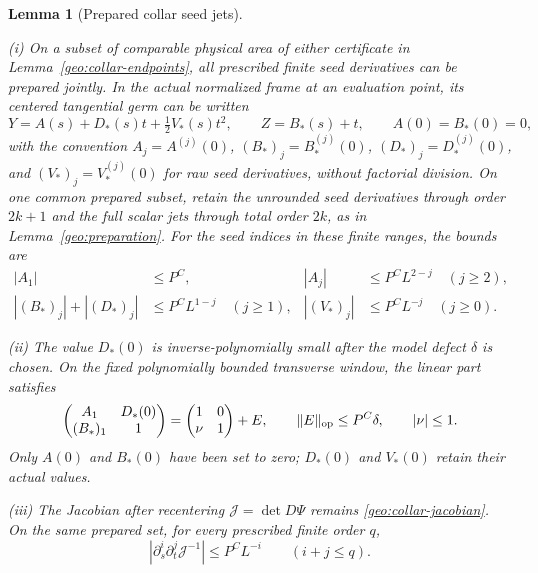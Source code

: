 \documentclass[11pt]{amsart}
\newtheorem{lemma}[theorem]{Lemma}
\theoremstyle{definition}
\theoremstyle{remark}
\numberwithin{equation}{section}
\begin{document}
\begin{lemma}[Prepared collar seed jets]\label{geo:collar-jets}

\leavevmode\noindent\textup{(i)} On a subset of comparable physical area of either certificate in Lemma~\ref{geo:collar-endpoints}, all prescribed finite seed derivatives can be prepared jointly. In the actual normalized frame at an evaluation point, its centered tangential germ can be written
\[
Y=A(s)+D_*(s)t+\tfrac12V_*(s)t^2,\qquad Z=B_*(s)+t,\qquad A(0)=B_*(0)=0,
\]
with the convention $A_j=A^{(j)}(0)$, $(B_*)_j=B_*^{(j)}(0)$, $(D_*)_j=D_*^{(j)}(0)$, and $(V_*)_j=V_*^{(j)}(0)$ for raw seed derivatives, without factorial division. On one common prepared subset, retain the unrounded seed derivatives through order $2k+1$ and the full scalar jets through total order $2k$, as in Lemma~\ref{geo:preparation}. For the seed indices in these finite ranges, the bounds are
\begin{equation}\label{geo:collar-seed-widths}
\begin{aligned}
|A_1|&\le P^C,& |A_j|&\le P^CL^{2-j}\quad(j\ge2),\\
|(B_*)_j|+|(D_*)_j|&\le P^CL^{1-j}\quad(j\ge1),& |(V_*)_j|&\le P^CL^{-j}\quad(j\ge0).
\end{aligned}
\end{equation}

\noindent\textup{(ii)} The value $D_*(0)$ is inverse-polynomially small after the model defect $\delta$ is chosen. On the fixed polynomially bounded transverse window, the linear part satisfies
\[
\begin{pmatrix}A_1&D_*(0)\\(B_*)_1&1\end{pmatrix}=\begin{pmatrix}1&0\\\nu&1\end{pmatrix}+E,\qquad \|E\|_{\rm op}\le P^C\delta,\qquad |\nu|\le1.
\]
Only $A(0)$ and $B_*(0)$ have been set to zero; $D_*(0)$ and $V_*(0)$ retain their actual values.

\noindent\textup{(iii)} The Jacobian after recentering $\mathcal J=\det D\Psi$ remains \eqref{geo:collar-jacobian}. On the same prepared set, for every prescribed finite order $q$,
\begin{equation}\label{geo:reciprocal-collar-jacobian}
\left|\partial_s^i\partial_t^j\mathcal J^{-1}\right|\le P^CL^{-i}\qquad(i+j\le q).
\end{equation}
\end{lemma}
\end{document}
